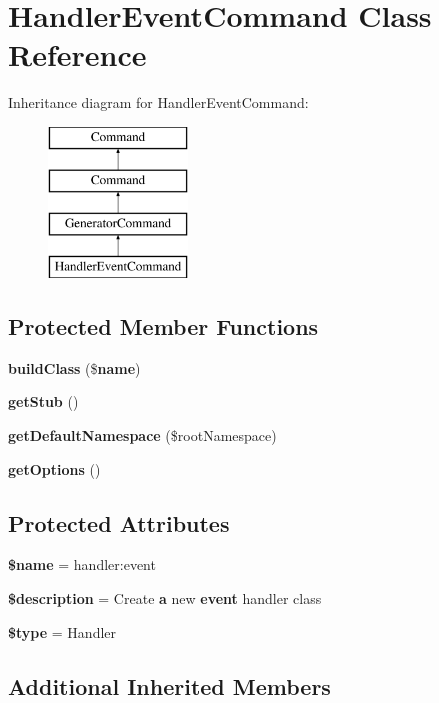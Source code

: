 \section{Handler\+Event\+Command Class Reference}
\label{class_illuminate_1_1_foundation_1_1_console_1_1_handler_event_command}
Inheritance diagram for Handler\+Event\+Command\+:\begin{figure}[H]
\begin{center}
\leavevmode
\includegraphics[height=4.000000cm]{class_illuminate_1_1_foundation_1_1_console_1_1_handler_event_command}
\end{center}
\end{figure}
\subsection*{Protected Member Functions}
\begin{DoxyCompactItemize}
\item 
{\bf build\+Class} (\${\bf name})
\item 
{\bf get\+Stub} ()
\item 
{\bf get\+Default\+Namespace} (\$root\+Namespace)
\item 
{\bf get\+Options} ()
\end{DoxyCompactItemize}
\subsection*{Protected Attributes}
\begin{DoxyCompactItemize}
\item 
{\bf \$name} = \textquotesingle{}handler\+:event\textquotesingle{}
\item 
{\bf \$description} = \textquotesingle{}Create {\bf a} new {\bf event} handler class\textquotesingle{}
\item 
{\bf \$type} = \textquotesingle{}Handler\textquotesingle{}
\end{DoxyCompactItemize}
\subsection*{Additional Inherited Members}


